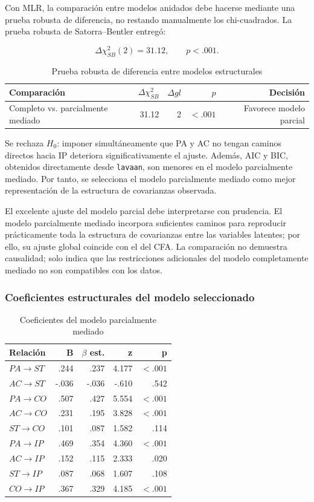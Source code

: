 \documentclass[12pt,letterpaper]{article}
\begin{document}
Con MLR, la comparación entre modelos anidados debe hacerse mediante una prueba robusta de diferencia, no restando manualmente los chi-cuadrados. La prueba robusta de Satorra--Bentler entregó:

\[
\Delta\chi^2_{SB}(2)=31.12,\qquad p<.001.
\]


\begin{table}[H]
\centering
\caption{Prueba robusta de diferencia entre modelos estructurales}
\label{tab:p3-dif-robusta}
\begin{tabular}{lrrrr}
\toprule
Comparación & $\Delta\chi^2_{SB}$ & $\Delta gl$ & $p$ & Decisión \\
\midrule
Completo vs. parcialmente mediado & 31.12 & 2 & $<.001$ & Favorece modelo parcial \\
\bottomrule
\end{tabular}
\end{table}

Se rechaza $H_0$: imponer simultáneamente que PA y AC no tengan caminos directos hacia IP deteriora significativamente el ajuste. Además, AIC y BIC, obtenidos directamente desde \texttt{lavaan}, son menores en el modelo parcialmente mediado. Por tanto, se selecciona el modelo parcialmente mediado como mejor representación de la estructura de covarianzas observada.

El excelente ajuste del modelo parcial debe interpretarse con prudencia. El modelo parcialmente mediado incorpora suficientes caminos para reproducir prácticamente toda la estructura de covarianzas entre las variables latentes; por ello, su ajuste global coincide con el del CFA. La comparación no demuestra causalidad; solo indica que las restricciones adicionales del modelo completamente mediado no son compatibles con los datos.

\subsubsection{Coeficientes estructurales del modelo seleccionado}

\begin{table}[H]
\centering
\caption{Coeficientes del modelo parcialmente mediado}
\begin{tabular}{lrrrr}
\toprule
Relación & B & $\beta$ est. & z & p \\
\midrule
$PA\rightarrow ST$ & .244 & .237 & 4.177 & $<.001$ \\
$AC\rightarrow ST$ & -.036 & -.036 & -.610 & .542 \\
$PA\rightarrow CO$ & .507 & .427 & 5.554 & $<.001$ \\
$AC\rightarrow CO$ & .231 & .195 & 3.828 & $<.001$ \\
$ST\rightarrow CO$ & .101 & .087 & 1.582 & .114 \\
$PA\rightarrow IP$ & .469 & .354 & 4.360 & $<.001$ \\
$AC\rightarrow IP$ & .152 & .115 & 2.333 & .020 \\
$ST\rightarrow IP$ & .087 & .068 & 1.607 & .108 \\
$CO\rightarrow IP$ & .367 & .329 & 4.185 & $<.001$ \\
\bottomrule
\end{tabular}
\end{table}
\end{document}
